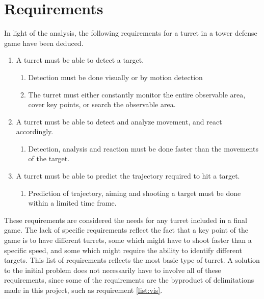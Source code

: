\section{Requirements}\label{sec:requirements}
In light of the analysis, the following requirements for a turret in a tower defense game have been deduced. 

\begin{enumerate}
    \item A turret must be able to detect a target.
    \begin{enumerate}
        \item\label{list:vis} Detection must be done visually or by motion detection
        \item The turret must either constantly monitor the entire observable area, cover key points, or search the observable area.
    \end{enumerate}
    
    \item A turret must be able to detect and analyze movement, and react accordingly.
    \begin{enumerate}
        \item Detection, analysis and reaction must be done faster than the movements of the target.
    \end{enumerate}
    
    \item A turret must be able to predict the trajectory required to hit a target.
    \begin{enumerate}
        \item Prediction of trajectory, aiming and shooting a target must be done within a limited time frame.
    \end{enumerate}
\end{enumerate}

These requirements are considered the needs for any turret included in a final game. The lack of specific requirements reflect the fact that a key point of the game is to have different turrets, some which might have to shoot faster than a specific speed, and some which might require the ability to identify different targets. This list of requirements reflects the most basic type of turret. A solution to the initial problem does not necessarily have to involve all of these requirements, since some of the requirements are the byproduct of delimitations made in this project, such as requirement \ref{list:vis}. \\

